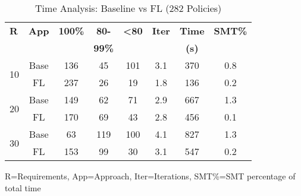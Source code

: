 \begin{table}[t]
\centering
\caption{Time Analysis: Baseline vs FL (282 Policies)}
\label{tab:time_compact}
\scriptsize
\setlength{\tabcolsep}{2pt}
\begin{tabular}{lccccccc}
\toprule
\textbf{R} & \textbf{App} & \textbf{100\%} & \textbf{80-} & \textbf{<80} & \textbf{Iter} & \textbf{Time} & \textbf{SMT\%} \\
& & & \textbf{99\%} & & & \textbf{(s)} & \\
\midrule
\multirow{2}{*}{10} & Base & 136 & 45 & 101 & 3.1 & 370 & 0.8 \\
 & FL & 237 & 26 & 19 & 1.8 & 136 & 0.2 \\
\midrule
\multirow{2}{*}{20} & Base & 149 & 62 & 71 & 2.9 & 667 & 1.3 \\
 & FL & 170 & 69 & 43 & 2.8 & 456 & 0.1 \\
\midrule
\multirow{2}{*}{30} & Base & 63 & 119 & 100 & 4.1 & 827 & 1.3 \\
 & FL & 153 & 99 & 30 & 3.1 & 547 & 0.2 \\
\bottomrule
\end{tabular}
\vspace{-2mm}
\begin{flushleft}
\scriptsize R=Requirements, App=Approach, Iter=Iterations, SMT\%=SMT percentage of total time
\end{flushleft}
\end{table}
